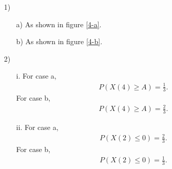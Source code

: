 \documentclass{assignment}
\begin{document}
\begin{sol}
    \begin{itemize}
        \item[1)] 
        \begin{itemize}
            \item[a)] As shown in figure \ref{4-a}.
            \item[b)] As shown in figure \ref{4-b}.
            \begin{figure}[h]
                \centering
                \caption{}
                \label{4}
            \end{figure}
        \end{itemize}
        \item[2)] 
        \begin{itemize}
            \item[i.] For case a,
            \begin{align}
                P(X(4)\geq A)=\frac{1}{3}.
            \end{align}
            For case b,
            \begin{align}
                P(X(4)\geq A)=\frac{2}{3}.
            \end{align}
            \item[ii.] For case a,
            \begin{align}
                P(X(2)\leq 0)=\frac{2}{3}.
            \end{align}
            For case b,
            \begin{align}
                P(X(2)\leq 0)=\frac{1}{3}.
            \end{align}
        \end{itemize}
    \end{itemize}
\end{sol}
\end{document}
